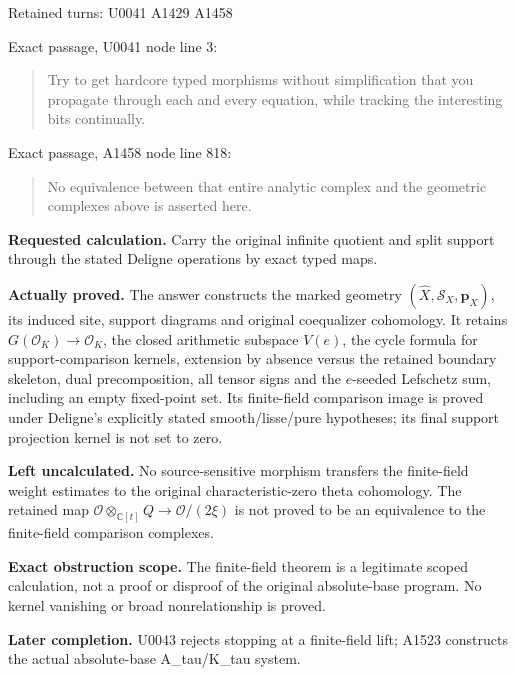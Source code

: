 \documentclass[10pt,a4paper,oneside]{report}
\begin{document}
Retained turns: U0041
\protect{} A1429
\protect{} A1458
\protect{}

Exact passage, U0041 node
\protect{} line 3:

\begin{quote}
Try to get hardcore typed morphisms without simplification that you
propagate through each and every equation, while tracking the
interesting bits continually.
\end{quote}

Exact passage, A1458 node
\protect{} line 818:

\begin{quote}
No equivalence between that entire analytic complex and the geometric
complexes above is asserted here.
\end{quote}

\textbf{Requested calculation.} Carry the original infinite quotient and
split support through the stated Deligne operations by exact typed maps.

\textbf{Actually proved.} The answer constructs the marked geometry
\((\widehat X,\mathcal S_X,\mathbf p_X)\), its induced site, support
diagrams and original coequalizer cohomology. It retains
\(G(\mathcal O_K)\to\mathcal O_K\), the closed arithmetic subspace
\(V(e)\), the cycle formula for support-comparison kernels, extension by
absence versus the retained boundary skeleton, dual precomposition, all
tensor signs and the \(e\)-seeded Lefschetz sum, including an empty
fixed-point set. Its finite-field comparison image is proved under
Deligne's explicitly stated smooth/lisse/pure hypotheses; its final
support projection kernel is not set to zero.

\textbf{Left uncalculated.} No source-sensitive morphism transfers the
finite-field weight estimates to the original characteristic-zero theta
cohomology. The retained map
\(\mathcal O\otimes_{\mathbb C[t]}Q\to\mathcal O/(2\xi)\) is not proved
to be an equivalence to the finite-field comparison complexes.

\textbf{Exact obstruction scope.} The finite-field theorem is a
legitimate scoped calculation, not a proof or disproof of the original
absolute-base program. No kernel vanishing or broad nonrelationship is
proved.

\textbf{Later completion.} U0043 rejects stopping at a finite-field
lift; A1523 constructs the actual absolute-base A\_tau/K\_tau system.
\end{document}
